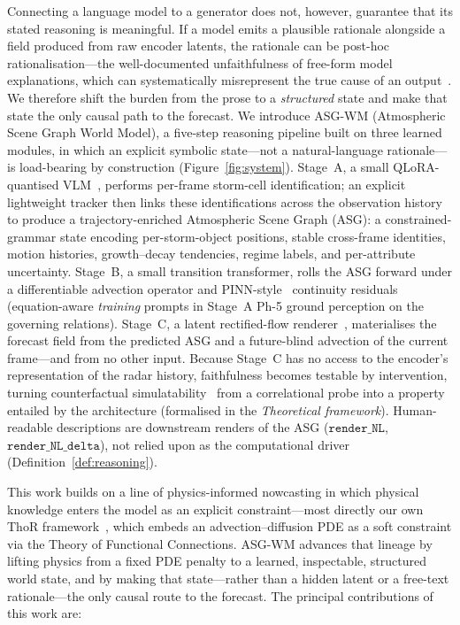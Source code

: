 \documentclass[fleqn,10pt]{wlscirep}
\begin{document}
Connecting a language model to a generator does not, however, guarantee that its stated reasoning is meaningful.
If a model emits a plausible rationale alongside a field produced from raw encoder latents, the rationale can be post-hoc rationalisation---the well-documented unfaithfulness of free-form model explanations, which can systematically misrepresent the true cause of an output~\cite{turpin2023cot,lanham2023faithfulness,chen2025reasoning}.
We therefore shift the burden from the prose to a \emph{structured} state and make that state the only causal path to the forecast.
We introduce ASG-WM (Atmospheric Scene Graph World Model), a five-step reasoning pipeline built on three learned modules, in which an explicit symbolic state---not a natural-language rationale---is load-bearing by construction (Figure~\ref{fig:system}).
Stage~A, a small QLoRA-quantised VLM~\cite{marafioti2025smolvlm,dettmers2023qlora}, performs per-frame storm-cell identification; an explicit lightweight tracker then links these identifications across the observation history to produce a trajectory-enriched Atmospheric Scene Graph (ASG): a constrained-grammar state encoding per-storm-object positions, stable cross-frame identities, motion histories, growth--decay tendencies, regime labels, and per-attribute uncertainty.
Stage~B, a small transition transformer, rolls the ASG forward under a differentiable advection operator and PINN-style~\cite{raissi2019pinn} continuity residuals (equation-aware \emph{training} prompts in Stage~A Ph-5 ground perception on the governing relations).
Stage~C, a latent rectified-flow renderer~\cite{liu2023rectifiedflow,rombach2022ldm}, materialises the forecast field from the predicted ASG and a future-blind advection of the current frame---and from no other input.
Because Stage~C has no access to the encoder's representation of the radar history, faithfulness becomes testable by intervention, turning counterfactual simulatability~\cite{chen2023counterfactual} from a correlational probe into a property entailed by the architecture (formalised in the \emph{Theoretical framework}).
Human-readable descriptions are downstream renders of the ASG ($\texttt{render\_NL}$, $\texttt{render\_NL\_delta}$), not relied upon as the computational driver (Definition~\ref{def:reasoning}).

This work builds on a line of physics-informed nowcasting in which physical knowledge enters the model as an explicit constraint---most directly our own ThoR framework~\cite{ta2025thor}, which embeds an advection--diffusion PDE as a soft constraint via the Theory of Functional Connections.
ASG-WM advances that lineage by lifting physics from a fixed PDE penalty to a learned, inspectable, structured world state, and by making that state---rather than a hidden latent or a free-text rationale---the only causal route to the forecast.
The principal contributions of this work are:
\end{document}
